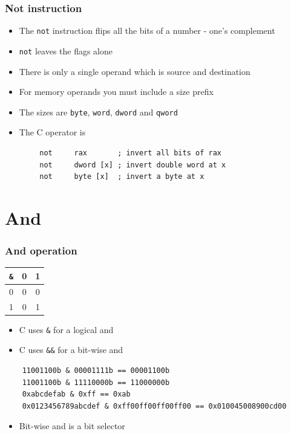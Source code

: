 \documentclass{beamer}
\begin{document}
\begin{frame}[fragile]
    \frametitle{Not instruction}
    \begin{itemize}
        \item The {\tt not} instruction flips all the bits of a number
              - one's complement
        \item {\tt not} leaves the flags alone
        \item There is only a single operand which is source and destination
        \item For memory operands you must include a size prefix
        \item The sizes are {\tt byte}, {\tt word}, {\tt dword} and {\tt qword}
        \item The C operator is 
    \end{itemize}
    \begin{verbatim}
        not     rax       ; invert all bits of rax
        not     dword [x] ; invert double word at x
        not     byte [x]  ; invert a byte at x
    \end{verbatim}
\end{frame}

\section{And}

\begin{frame}[fragile]
    \frametitle{And operation}
\begin{center}
\begin{tabular}{c|cc}
{\tt \&} & 0 & 1 \\
\hline
0       & 0 & 0 \\
1       & 0 & 1 \\
\end{tabular}
\end{center}
    \begin{itemize}
        \item C uses {\tt \&} for a logical and
        \item C uses {\tt \&\&} for a bit-wise and
    \end{itemize}
\small
\begin{verbatim}
    11001100b & 00001111b == 00001100b
    11001100b & 11110000b == 11000000b
    0xabcdefab & 0xff == 0xab
    0x0123456789abcdef & 0xff00ff00ff00ff00 == 0x010045008900cd00
\end{verbatim}
\begin{itemize}
    \item Bit-wise and is a bit selector
\end{itemize}

\end{frame}
\end{document}
